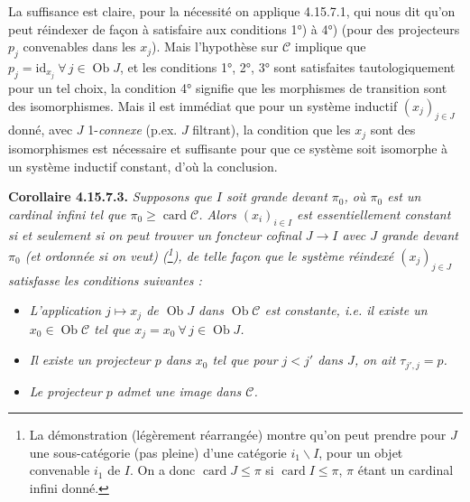 \documentclass[11pt]{article}
\newcommand{\printedpage}[1]{\marginpar{\footnotesize p.~#1}}
\newcommand{\msp}[1]{\marginpar{\footnotesize [#1]}}
\newcommand{\cC}{\mathcal{C}}
\newcommand{\Ob}{\operatorname{Ob}}
\newcommand{\id}{\mathrm{id}}
\newcommand{\card}{\operatorname{card}}
\begin{document}
La suffisance est claire, pour la nécessité on applique 4.15.7.1, qui nous dit qu'on peut réindexer de façon à satisfaire aux conditions 1°) à 4°) (pour des projecteurs $p_j$ convenables dans les $x_j$). Mais l'hypothèse sur $\cC$ implique que $p_j = \id_{x_j}\ \forall\, j \in \Ob J$, et les conditions 1°, 2°, 3° sont satisfaites tautologiquement pour un tel choix, la condition 4° signifie que les morphismes de transition sont des isomorphismes. Mais il est immédiat que pour un système inductif $(x_j)_{j\in J}$ donné, avec $J$ 1-\textit{connexe} (p.ex. $J$ filtrant), la condition que les $x_j$ sont des isomorphismes %
est nécessaire et suffisante pour que ce système soit isomorphe à un système inductif constant, d'où la conclusion.

\printedpage{170}
\msp{page 443}
\textbf{Corollaire 4.15.7.3.} \textit{Supposons que $I$ soit grande devant $\pi_0$, où $\pi_0$ est un cardinal infini tel que $\pi_0 \geqslant \card \cC$. Alors $(x_i)_{i\in I}$ est essentiellement constant si et seulement si on peut trouver un foncteur cofinal $J \longrightarrow I$ avec $J$ grande devant $\pi_0$ (et ordonnée si on veut) (\footnote{La démonstration (légèrement réarrangée) montre qu'on peut prendre pour $J$ une sous-catégorie (pas pleine) d'une catégorie $i_1\backslash I$, pour un objet convenable $i_1$ de $I$. On a donc $\card J \leqslant \pi$ si $\card I \leqslant \pi$, $\pi$ étant un cardinal infini donné.}), de telle façon que le système réindexé $(x_j)_{j\in J}$ satisfasse les conditions suivantes :}
\begin{itemize}
\item[\textit{1°)}] \textit{L'application $j \longmapsto x_j$ de $\Ob J$ dans $\Ob\cC$ est constante, i.e. il existe un $x_0 \in \Ob\cC$ tel que $x_j = x_0\ \forall\, j \in \Ob J$.}
\item[\textit{2°)}] \textit{Il existe un projecteur $p$ dans $x_0$ tel que pour $j < j'$ dans $J$, on ait $\tau_{j',j} = p$.}
\item[\textit{3°)}] \textit{Le projecteur $p$ admet une image dans $\cC$.}
\end{itemize}
\end{document}

